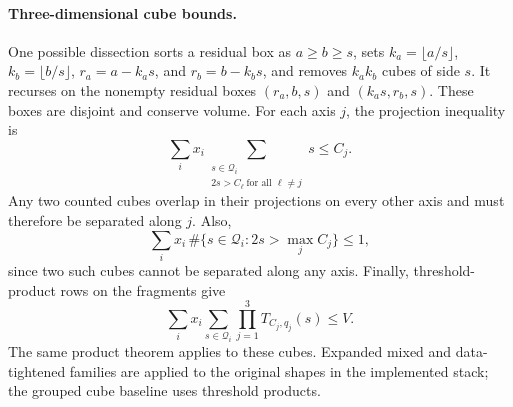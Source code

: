 \paragraph{Three-dimensional cube bounds.}
One possible dissection sorts a residual box as $a\geq b\geq s$,
sets $k_a=\lfloor a/s\rfloor$, $k_b=\lfloor b/s\rfloor$,
$r_a=a-k_as$, and $r_b=b-k_bs$, and removes $k_ak_b$ cubes of side $s$.
It recurses on the nonempty residual boxes $(r_a,b,s)$ and
$(k_as,r_b,s)$. These boxes are disjoint and conserve volume.
For each axis $j$, the projection inequality is
\begin{equation}
 \sum_i x_i\sum_{\substack{s\in\mathcal Q_i\\
                     2s>C_\ell\ \text{for all }\ell\ne j}}s\leq C_j.
                                                               \label{eq:cube-projection}
\end{equation}
Any two counted cubes overlap in their projections on every other
axis and must therefore be separated along $j$. Also,
\begin{equation}
 \sum_i x_i\,\#\{s\in\mathcal Q_i:2s>\max_j C_j\}\leq1,
                                                               \label{eq:cube-clique}
\end{equation}
since two such cubes cannot be separated along any axis. Finally,
threshold-product rows on the fragments give
\begin{equation}
 \sum_i x_i\sum_{s\in\mathcal Q_i}
           \prod_{j=1}^3 T_{C_j,q_j}(s)\leq V.                  \label{eq:cube-product}
\end{equation}
The same product theorem applies to these cubes. Expanded mixed and
data-tightened families are applied to the original shapes in the
implemented stack; the grouped cube baseline uses threshold products.

